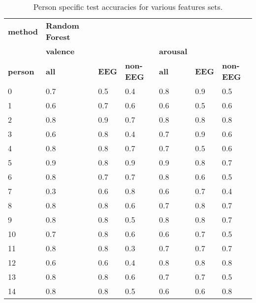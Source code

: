 \begin{table}[]
\centering
\caption{Person specific test accuracies for various features sets.}
\begin{tabular}{l|lll|lll}
\textbf{method}          & \textbf{Random Forest}        &           &         &         &     &         \\
                & \textbf{valence}              &           &         & \textbf{arousal} &     &         \\
\textbf{person}          & \textbf{all}                  & \textbf{EEG}       & \textbf{non-EEG} & \textbf{all}     & \textbf{EEG} & \textbf{non-EEG} \\ \hline 
 0               & 0.7                  & 0.5       & 0.4     & 0.8     & 0.9 & 0.5     \\
1               & 0.6                  & 0.7       & 0.6     & 0.6     & 0.5 & 0.6     \\
2               & 0.8                  & 0.9       & 0.7     & 0.8     & 0.8 & 0.8     \\
3               & 0.6                  & 0.8       & 0.4     & 0.7     & 0.9 & 0.6     \\
4               & 0.8                  & 0.8       & 0.7     & 0.7     & 0.5 & 0.6     \\
5               & 0.9                  & 0.8       & 0.9     & 0.9     & 0.8 & 0.7     \\
6               & 0.8                  & 0.7       & 0.7     & 0.8     & 0.6 & 0.5     \\
7               & 0.3                  & 0.6       & 0.8     & 0.6     & 0.7 & 0.4     \\
8               & 0.8                  & 0.8       & 0.6     & 0.7     & 0.8 & 0.7     \\
9               & 0.8                  & 0.8       & 0.5     & 0.8     & 0.8 & 0.7     \\
10              & 0.7                  & 0.8       & 0.6     & 0.6     & 0.7 & 0.5     \\
11              & 0.8                  & 0.8       & 0.3     & 0.7     & 0.7 & 0.7     \\
12              & 0.6                  & 0.6       & 0.4     & 0.8     & 0.8 & 0.8     \\
13              & 0.8                  & 0.8       & 0.6     & 0.7     & 0.7 & 0.5     \\
14              & 0.8                  & 0.8       & 0.5     & 0.6     & 0.6 & 0.8     \\

\end{tabular}
\end{table}
